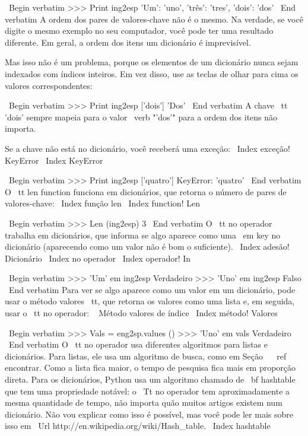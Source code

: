 \documentclass[10pt]{book}
\begin{document}
\begin {itemize}
{{{{{{{\ Begin {verbatim}
>>> Print ing2esp
{'Um': 'uno', 'três': 'tres', 'dois': 'dos'}
\ End {verbatim}
%
A ordem dos pares de valores-chave não é o mesmo. Na verdade, se
você digite o mesmo exemplo no seu computador, você pode ter uma
resultado diferente. Em geral, a ordem dos itens
um dicionário é imprevisível.

Mas isso não é um problema, porque
os elementos de um dicionário nunca sejam indexados com índices inteiros.
Em vez disso, use as teclas de olhar para cima os valores correspondentes:

\ Begin {verbatim}
>>> Print ing2esp ['dois']
'Dos'
\ End {verbatim}
%
A chave {\ tt 'dois'} sempre mapeia para o valor \ verb "'dos'" para a ordem
dos itens não importa.

Se a chave não está no dicionário, você receberá uma exceção:
\ Index {exceção! KeyError}
\ Index {} KeyError

\ Begin {verbatim}
>>> Print ing2esp ['quatro']
KeyError: 'quatro'
\ End {verbatim}
%
O {\ tt len} function funciona em dicionários, que retorna o
número de pares de valores-chave:
\ Index {função len}
\ Index {function! Len}

\ Begin {verbatim}
>>> Len (ing2esp)
3
\ End {verbatim}
%
O {\ tt no} operador trabalha em dicionários, que informa se
algo aparece como uma {\ em key} no dicionário (aparecendo
como um valor não é bom o suficiente).
\ Index {adesão! Dicionário}
\ Index {} no operador
\ Index {operador! In}

\ Begin {verbatim}
>>> 'Um' em ing2esp
Verdadeiro
>>> 'Uno' em ing2esp
Falso
\ End {verbatim}
%
Para ver se algo aparece como um valor em um dicionário,
pode usar o método {valores \ tt}, que retorna os valores como
uma lista e, em seguida, usar o {\ tt no} operador:
\ {} Método valores de índice
\ Index {método! Valores}

\ Begin {verbatim}
>>> Vals = eng2sp.values ​​()
>>> 'Uno' em vals
Verdadeiro
\ End {verbatim}
%
O {\ tt no} operador usa diferentes algoritmos para listas e
dicionários. Para listas, ele usa um algoritmo de busca, como em
Seção ~ \ ref {} encontrar. Como a lista fica maior, o tempo de pesquisa fica
mais em proporção direta. Para os dicionários, Python usa um
algoritmo chamado de {\ bf hashtable} que tem uma propriedade notável: o
{\ Tt no} operador tem aproximadamente a mesma quantidade de tempo, não importa quão
muitos artigos existem num dicionário. Não vou explicar como isso é
possível, mas você pode ler mais sobre isso em
\ Url {http://en.wikipedia.org/wiki/Hash_table}.
\ Index {} hashtable

}}}}}}}
\end{itemize}
\end{document}
